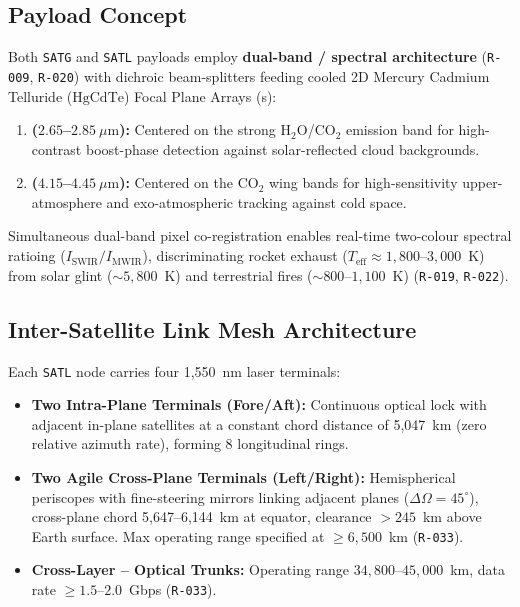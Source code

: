 \subsection{Payload Concept}

Both \texttt{SATG} and \texttt{SATL} payloads employ \textbf{dual-band / spectral architecture} (\texttt{R-009}, \texttt{R-020}) with dichroic beam-splitters feeding cooled 2D Mercury Cadmium Telluride ($\mathrm{HgCdTe}$) Focal Plane Arrays (s):
\begin{enumerate}
    \item \textbf{ ($2.65$--$2.85~\mu\mathrm{m}$):} Centered on the strong $\mathrm{H_2O}$/$\mathrm{CO_2}$ emission band for high-contrast boost-phase detection against solar-reflected cloud backgrounds.
    \item \textbf{ ($4.15$--$4.45~\mu\mathrm{m}$):} Centered on the $\mathrm{CO_2}$ wing bands for high-sensitivity upper-atmosphere and exo-atmospheric tracking against cold space.
\end{enumerate}
Simultaneous dual-band pixel co-registration enables real-time two-colour spectral ratioing ($I_{\text{SWIR}}/I_{\text{MWIR}}$), discriminating rocket exhaust ($T_{\text{eff}} \approx 1{,}800$--$3{,}000$~K) from solar glint (${\sim}5{,}800$~K) and terrestrial fires (${\sim}800$--$1{,}100$~K) (\texttt{R-019}, \texttt{R-022}).

\subsection{Inter-Satellite Link Mesh Architecture}

Each \texttt{SATL} node carries four 1,550~nm laser  terminals:
\begin{itemize}
    \item \textbf{Two Intra-Plane Terminals (Fore/Aft):} Continuous optical lock with adjacent in-plane satellites at a constant chord distance of 5,047~km (zero relative azimuth rate), forming 8 longitudinal rings.
    \item \textbf{Two Agile Cross-Plane Terminals (Left/Right):} Hemispherical periscopes with fine-steering mirrors linking adjacent planes ($\Delta\Omega = 45^\circ$), cross-plane chord 5,647--6,144~km at equator,  clearance $> 245$~km above Earth surface. Max operating range specified at $\ge 6{,}500$~km (\texttt{R-033}).
    \item \textbf{Cross-Layer -- Optical Trunks:} Operating range $34{,}800$--$45{,}000$~km, data rate $\ge 1.5$--$2.0$~Gbps (\texttt{R-033}).
\end{itemize}

